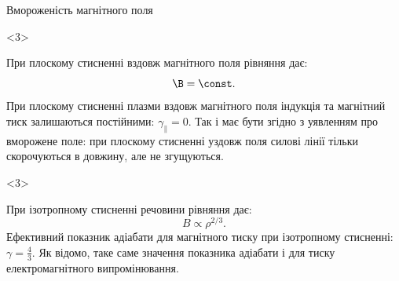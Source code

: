 \documentclass[]{beamer}
\begin{document}
\begin{frame}{Вмороженість магнітного поля}{}
	\begin{onlyenv}
		\begin{block}{}\scriptsize
			\alert{При плоскому стисненні вздовж магнітного поля} рівняння дає:
			\begin{equation*}
				\B = \const.
			\end{equation*}
			При плоскому стисненні плазми вздовж магнітного поля індукція та магнітний тиск
			залишаються постійними: $\gamma_{\parallel} = 0$. Так і має бути згідно з уявленням про вморожене поле: при плоскому стисненні уздовж поля силові лінії тільки скорочуються в довжину, але не згущуються.
		\end{block}
	\end{onlyenv}

	\begin{onlyenv}
		\begin{block}{}\scriptsize
			\alert{При ізотропному стисненні речовини} рівняння дає:
			\begin{equation*}
				B \propto \rho^{2/3}.
			\end{equation*}
			Ефективний показник адіабати для магнітного тиску при ізотропному стисненні: $\gamma= \frac43$. Як відомо, таке саме значення показника адіабати і для тиску електромагнітного випромінювання.
		\end{block}
	\end{onlyenv}
\end{frame}
\end{document}
